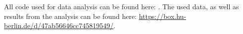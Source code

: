 

	All code used for data analysis can be found here: \url{}. The used data, as well as results from the analysis can be found here: \url{https://box.hu-berlin.de/d/47ab56646cc745819549/}.